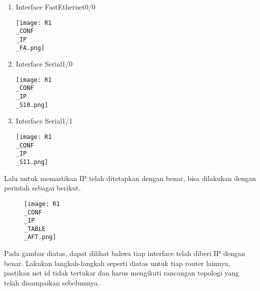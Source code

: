 \documentclass[12pt, a4paper]{article}
\begin{document}
  \begin{enumerate}
    \item Interface FastEthernet0/0
      \begin{center}
        \texttt{[image: R1\\\_CONF\\\_IP\\\_FA.png]}
      \end{center}

    \item Interface Serial1/0
      \begin{center}
        \texttt{[image: R1\\\_CONF\\\_IP\\\_S10.png]}
      \end{center}

    \item Interface Serial1/1
      \begin{center}
        \texttt{[image: R1\\\_CONF\\\_IP\\\_S11.png]}
      \end{center}
  \end{enumerate}
Lalu untuk memastikan IP telah ditetapkan dengan benar, bisa dilakukan dengan perintah sebagai berikut.

  \begin{figure}[h]
      \centering
      \texttt{[image: R1\\\_CONF\\\_IP\\\_TABLE\\\_AFT.png]}
  \end{figure}

  Pada gambar diatas, dapat dilihat bahwa tiap interface telah diberi IP
  dengan benar. Lakukan langkah-langkah seperti diatas untuk tiap
  router lainnya, pastikan net id tidak tertukar dan harus mengikuti
  rancangan topologi yang telah disampaikan sebelumnya.
\end{document}
